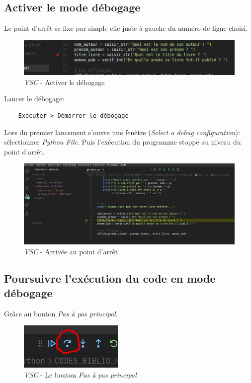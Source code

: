 \documentclass[a4paper,11pt]{book}
\begin{document}
\subsection*{Activer le mode débogage}
Le point d'arrêt se fixe par simple clic juste à gauche du numéro de ligne choisi.
\begin{figure}[h]
\begin{center}
\includegraphics[scale=0.3]{IMG/VSC-01.png}
\caption{\textit{VSC} - Activer le débogage}
\end{center}
\end{figure}
\medskip

Lancer le débogage:
\begin{verbatim}
    Exécuter > Démarrer le débogage
\end{verbatim}
\medskip

Lors du premier lancement s'ouvre une fenêtre (\textit{Select a debug configuration}): sélectionner \textit{Python File}. Puis l'exécution du programme stoppe au niveau du point d'arrêt.
\begin{figure}[h]
\begin{center}
\includegraphics[scale=0.3]{IMG/VSC-02.png}
\caption{\textit{VSC} - Arrivée au point d'arrêt}
\end{center}
\end{figure}
\medskip

\subsection*{Poursuivre l'exécution du code en mode débogage}
Grâce au bouton \textit{Pas à pas principal}.
\begin{figure}[h]
\begin{center}
\includegraphics[scale=0.6]{IMG/VSC-03.png}
\caption{\textit{VSC} - Le bouton \textit{Pas à pas principal}}
\end{center}
\end{figure}
\medskip
\end{document}
